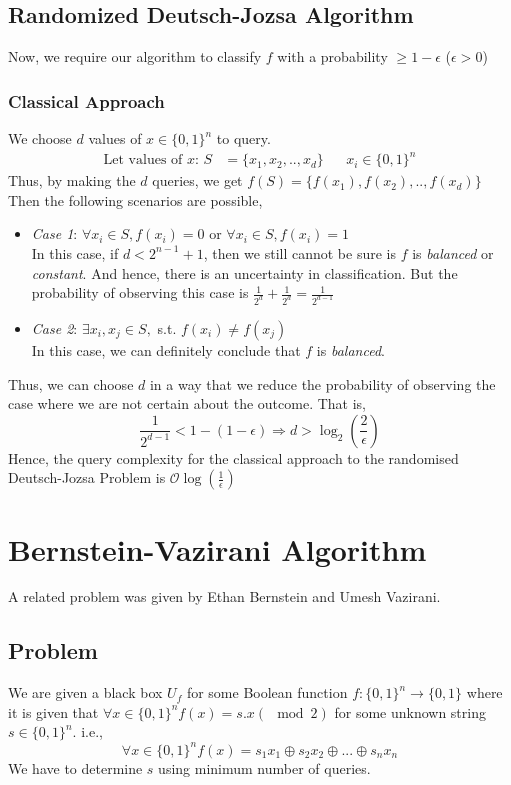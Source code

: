 \documentclass[11.5pt, paper=a4]{article}
\theoremstyle{definition}
\numberwithin{theorem}{section}
\begin{document}
\subsection{Randomized Deutsch-Jozsa Algorithm}
Now, we require our algorithm to classify $f$ with a probability $\geq1-\epsilon$ ($\epsilon>0$)

\subsubsection{Classical Approach}
We choose $d$ values of $x\in\{0,1\}^n$ to query.
\begin{align*}
\text{Let values of }x\text{: }S&=\{x_1,x_2,..,x_d\}&&x_i\in\{0,1\}^n
\end{align*}
Thus, by making the $d$ queries, we get $f(S)=\{f(x_1),f(x_2),..,f(x_d)\}$
Then the following scenarios are possible,
\begin{itemize}
    \item \emph{Case 1}: $\forall x_i\in S,f(x_i)=0$ or $\forall x_i\in S,f(x_i)=1$\\In this case, if $d<2^{n-1}+1$, then we still cannot be sure is $f$ is \emph{balanced} or \emph{constant}. And hence, there is an uncertainty in classification. But the probability of observing this case is $\frac{1}{2^d}+\frac{1}{2^d}=\frac{1}{2^{d-1}}$
    \item \emph{Case 2}: $\exists x_i,x_j\in S,$ s.t. $f(x_i)\neq f(x_j)$\\In this case, we can definitely conclude that $f$ is \emph{balanced}.
\end{itemize}
Thus, we can choose $d$ in a way that we reduce the probability of observing the case where we are not certain about the outcome. That is,
\begin{equation}
\frac{1}{2^{d-1}}<1-(1-\epsilon)\Rightarrow d>\log_2\left(\frac{2}{\epsilon}\right)
\end{equation}
Hence, the query complexity for the classical approach to the randomised Deutsch-Jozsa Problem is $\mathcal{O}\log\left(\frac{1}{\epsilon}\right)$



\section{Bernstein-Vazirani Algorithm}
A related problem was given by Ethan Bernstein and Umesh Vazirani.

\subsection{Problem}
We are given a black box $U_f$ for some Boolean function $f:\{0,1\}^n\rightarrow\{0,1\}$ where it is given that $\forall x\in \{0,1\}^nf(x)=s.x(\mod2)$ for some unknown string $s\in \{0,1\}^n$. i.e.,
\begin{equation*}
\forall x\in \{0,1\}^nf(x)=s_1x_1\oplus s_2x_2\oplus...\oplus s_nx_n
\end{equation*}
We have to determine $s$ using minimum number of queries.
\end{document}

